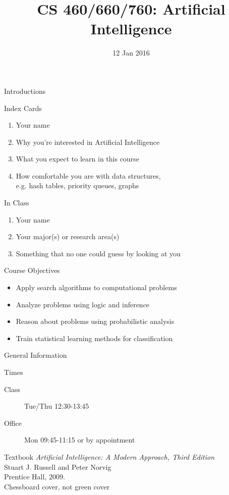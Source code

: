 \documentclass[14pt]{beamer}
\title{CS 460/660/760: Artificial Intelligence}
\date[]{12 Jan 2016}
\begin{document}
\begin{frame}
  \titlepage
\end{frame}

\begin{frame}{Introductions}
	\begin{block}{Index Cards}
		\begin{enumerate}
			\item Your name
			\item Why you're interested in Artificial Intelligence
			\item What you expect to learn in this course
			\item How comfortable you are with data structures, \\
			      e.g. hash tables, priority queues, graphs
		\end{enumerate}
	\end{block}
	\pause
	\begin{block}{In Class}
		\begin{enumerate}
			\item Your name
			\item Your major(s) or research area(s)
			\item Something that no one could guess by looking at you
		\end{enumerate}
	\end{block}
\end{frame}

\begin{frame}{Course Objectives}
	\begin{itemize}
		\item Apply search algorithms to computational problems
		\item Analyze problems using logic and inference
		\item Reason about problems using probabilistic analysis
		\item Train statistical learning methods for classification
	\end{itemize}
\end{frame}

\begin{frame}{General Information}
	\begin{block}{Times}
		\begin{description}
			\item[Class] Tue/Thu 12:30-13:45
			\item[Office] Mon 09:45-11:15 or by appointment
		\end{description}
	\end{block}
	\begin{block}{Textbook}
		\textit{Artificial Intelligence: A Modern Approach, Third Edition}\\		
		Stuart J. Russell and Peter Norvig\\
		Prentice Hall, 2009.\\
		\hfill \alert{Chessboard cover, not green cover}
	\end{block}
\end{frame}
\end{document}
